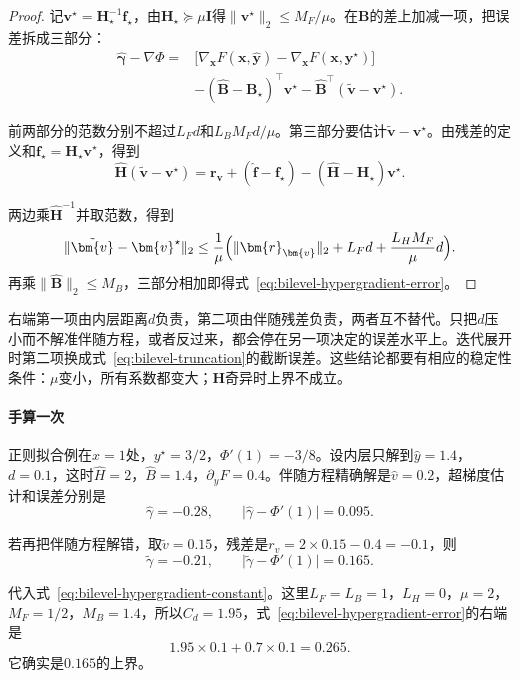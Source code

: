 \begin{proof}
记$\bm{v}^\star=\bm{H}_\star^{-1}\bm{f}_\star$，由$\bm{H}_\star\succeq\mu\bm{I}$得$\lVert\bm{v}^\star\rVert_2\leq M_F/\mu$。在$\bm{B}$的差上加减一项，把误差拆成三部分：
\[
 \begin{aligned}
 \hat{\bm{\gamma}}-\nabla\Phi={}&\bigl[\nabla_{\bm{x}}F(\bm{x},\hat{\bm{y}})-\nabla_{\bm{x}}F(\bm{x},\bm{y}^\star)\bigr]\\
 &-(\hat{\bm{B}}-\bm{B}_\star)^{\top}\bm{v}^\star-\hat{\bm{B}}^{\top}(\tilde{\bm{v}}-\bm{v}^\star).
 \end{aligned}
\]

前两部分的范数分别不超过$L_Fd$和$L_BM_Fd/\mu$。第三部分要估计$\tilde{\bm{v}}-\bm{v}^\star$。由残差的定义和$\bm{f}_\star=\bm{H}_\star\bm{v}^\star$，得到
\[
 \hat{\bm{H}}(\tilde{\bm{v}}-\bm{v}^\star)=\bm{r}_{\bm{v}}+(\hat{\bm{f}}-\bm{f}_\star)-(\hat{\bm{H}}-\bm{H}_\star)\bm{v}^\star.
\]

两边乘$\hat{\bm{H}}^{-1}$并取范数，得到
\[
 \lVert\tilde{\bm{v}}-\bm{v}^\star\rVert_2\leq\frac{1}{\mu}\Bigl(\lVert\bm{r}_{\bm{v}}\rVert_2+L_Fd+\frac{L_HM_F}{\mu}d\Bigr).
\]
再乘$\lVert\hat{\bm{B}}\rVert_2\leq M_B$，三部分相加即得式~\eqref{eq:bilevel-hypergradient-error}。
\end{proof}

右端第一项由内层距离$d$负责，第二项由伴随残差负责，两者互不替代。只把$d$压小而不解准伴随方程，或者反过来，都会停在另一项决定的误差水平上。迭代展开时第二项换成式~\eqref{eq:bilevel-truncation}的截断误差。这些结论都要有相应的稳定性条件：$\mu$变小，所有系数都变大；$\bm{H}$奇异时上界不成立。

\paragraph{手算一次}
正则拟合例在$x=1$处，$y^\star=3/2$，$\Phi'(1)=-3/8$。设内层只解到$\hat{y}=1.4$，$d=0.1$，这时$\hat{H}=2$，$\hat{B}=1.4$，$\partial_yF=0.4$。伴随方程精确解是$\hat{v}=0.2$，超梯度估计和误差分别是
\[
 \hat{\gamma}=-0.28,\qquad\lvert\hat{\gamma}-\Phi'(1)\rvert=0.095.
\]

若再把伴随方程解错，取$\tilde{v}=0.15$，残差是$r_v=2\times0.15-0.4=-0.1$，则
\[
 \tilde{\gamma}=-0.21,\qquad\lvert\tilde{\gamma}-\Phi'(1)\rvert=0.165.
\]

代入式~\eqref{eq:bilevel-hypergradient-constant}。这里$L_F=L_B=1$，$L_H=0$，$\mu=2$，$M_F=1/2$，$M_B=1.4$，所以$C_d=1.95$，式~\eqref{eq:bilevel-hypergradient-error}的右端是
\[
 1.95\times0.1+0.7\times0.1=0.265.
\]
它确实是$0.165$的上界。


